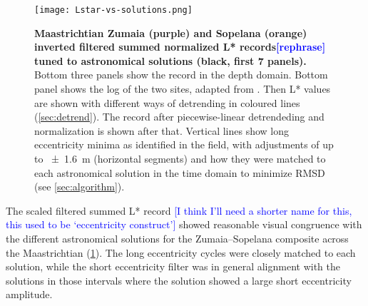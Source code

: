 \documentclass[draft]{agujournal2019}
\newcommand{\ma}[1]{Ma\(_{405}\)#1} %
\newcommand{\ijk}{\textcolor{blue}}
\begin{document}
\begin{figure}
  \centering
  \texttt{[image: Lstar-vs-solutions.png]}
  \caption{\label{fig:rolling-depth-age}
    \textbf{Maastrichtian Zumaia (purple) and Sopelana (orange) inverted filtered summed normalized \gls{L*} records\ijk{[rephrase]} tuned to astronomical solutions (black, first 7 panels).}
    Bottom three panels show the record in the depth domain.
    Bottom panel shows the log of the two sites, adapted from .
    Then \gls{L*} values are shown with different ways of detrending in coloured lines (\cref{sec:detrend}).
    The record after piecewise-linear detrendeding and normalization is shown after that.
    Vertical lines show long eccentricity minima as identified in the field,
    with adjustments of up to \qty{\pm1.6}{\metre} (horizontal segments)
    and how they were matched to each astronomical solution in the time domain to minimize \gls{RMSD} (see \cref{sec:algorithm}).
    }
\end{figure}



The scaled filtered summed \gls{L*} record \ijk{[I think I'll need a shorter name for this, this used to be `eccentricity construct']} showed reasonable visual congruence with the different astronomical solutions for the Zumaia--Sopelana composite across the Maastrichtian (\cref{fig:rolling-depth-age}). %
The long eccentricity cycles were closely matched to each solution, while the short eccentricity filter was in general alignment with the solutions in those intervals where the solution showed a large short eccentricity amplitude.
\end{document}
